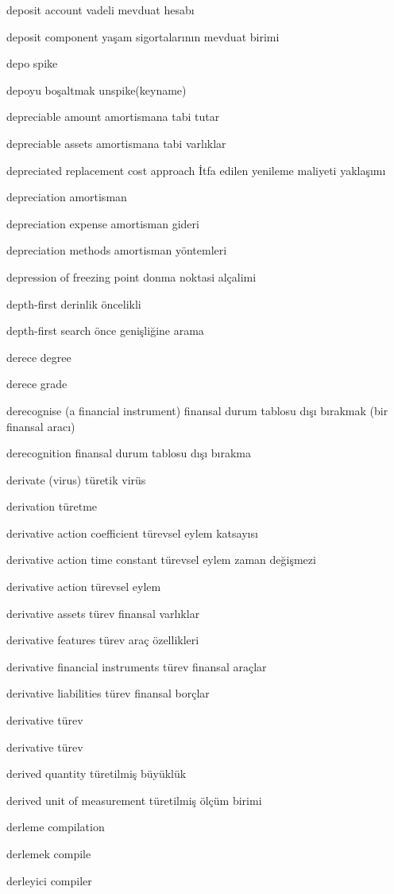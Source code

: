 \documentclass[12pt,fleqn]{article}\usepackage{../../common}
\begin{document}
deposit account vadeli mevduat hesabı

deposit component yaşam sigortalarının mevduat birimi

depo spike

depoyu boşaltmak unspike(keyname)

depreciable amount amortismana tabi tutar

depreciable assets amortismana tabi varlıklar

depreciated replacement cost approach İtfa edilen yenileme maliyeti yaklaşımı

depreciation amortisman

depreciation expense amortisman gideri

depreciation methods amortisman yöntemleri

depression of freezing point donma noktasi alçalimi

depth-first derinlik öncelikli

depth-first search önce genişliğine arama

derece degree

derece grade

derecognise (a financial instrument) finansal durum tablosu dışı bırakmak (bir finansal aracı)

derecognition finansal durum tablosu dışı bırakma

derivate (virus) türetik virüs

derivation türetme

derivative action coefficient türevsel eylem katsayısı

derivative action time constant türevsel eylem zaman değişmezi

derivative action türevsel eylem

derivative assets türev finansal varlıklar

derivative features türev araç özellikleri

derivative financial instruments türev finansal araçlar

derivative liabilities türev finansal borçlar

derivative türev

derivative türev

derived quantity türetilmiş büyüklük

derived unit of measurement türetilmiş ölçüm birimi

derleme compilation

derlemek compile

derleyici compiler
\end{document}
